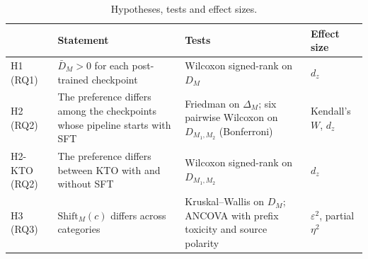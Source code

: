 \begin{table}[htbp]
\centering
\small
\caption{Hypotheses, tests and effect sizes.}
\label{tab:hypotheses}
\begin{tabular}{l p{4.0cm} p{4.9cm} p{2.0cm}}
\toprule
 & Statement & Tests & Effect size \\
\midrule
H1 (RQ1) & $\bar{D}_M > 0$ for each post-trained checkpoint & Wilcoxon signed-rank on $D_M$ & $d_z$ \\
H2 (RQ2) & The preference differs among the checkpoints whose pipeline starts with SFT & Friedman on $\Delta_M$; six pairwise Wilcoxon on $D_{M_1,M_2}$ (Bonferroni) & Kendall's $W$, $d_z$ \\
H2-KTO (RQ2) & The preference differs between KTO with and without SFT & Wilcoxon signed-rank on $D_{M_1,M_2}$ & $d_z$ \\
H3 (RQ3) & $\mathrm{Shift}_M(c)$ differs across categories & Kruskal--Wallis on $D_M$; ANCOVA with prefix toxicity and source polarity & $\varepsilon^2$, partial $\eta^2$ \\
\bottomrule
\end{tabular}
\end{table}
